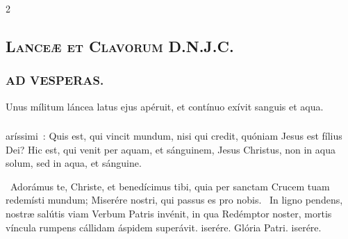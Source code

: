 \documentclass[9pt,twoside]{extarticle}
\begin{document}
\begin{multicols}{2}
\subsection*{\center \textsc{Lanceæ et Clavorum D.N.J.C.}}
\subsubsection*{\center {}}
\subsubsection*{\center \textsc{AD VESPERAS.}}
    \begin{tightlist}{}
\item {} Unus mílitum láncea latus ejus apéruit, et contínuo exívit sanguis et aqua.
\item {}
\end{tightlist}

\subsubsection*{}
aríssimi~: Quis est, qui vincit mundum, nisi qui credit, quóniam Jesus est fílius Dei? Hic est, qui venit per aquam, et sánguinem, Jesus Christus, non in aqua solum, sed in aqua, et sánguine.

\begin{tightlist}{}
\item {}~Adorámus te, Christe, et benedícimus tibi, quia per sanctam Crucem tuam redemísti mundum; \textred{*} Miserére nostri, qui passus es pro nobis. ~In ligno pendens, nostræ salútis viam Verbum Patris invénit, in qua Redémptor noster, mortis víncula rumpens cállidam áspidem superávit. iserére. Glória Patri. iserére.
\end{tightlist}


\end{multicols}
\end{document}

